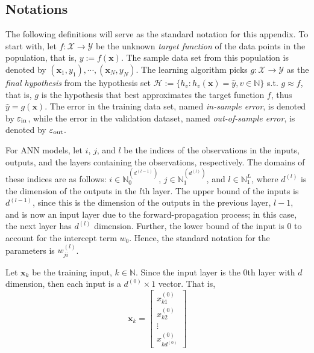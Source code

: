\subsection{Notations}
The following definitions will serve as the standard notation for this appendix. To start with, let $f:\mathcal{X}\to\mathcal{Y}$ be the unknown \textit{target function} of the data points in the population, that is, $y:=f(\mathbf{x})$. The sample data set from this population is denoted by $(\mathbf{x}_1,y_1),\cdots,(\mathbf{x}_N,y_N)$. The learning algorithm picks $g:\mathcal{X}\to \mathcal{Y}$ as the \textit{final hypothesis} from the hypothesis set $\mathscr{H}:=\{h_v:h_v(\mathbf{x})=\hat{y},v\in\mathbb{N}\}$ s.t. $g\approx f$, that is, $g$ is the hypothesis that best approximates the target function $f$, thus $\hat{y}=g(\mathbf{x})$. The error in the training data set, named \textit{in-sample error}, is denoted by $\varepsilon_{\mathrm{in}}$, while the error in the validation dataset, named \textit{out-of-sample error}, is denoted by $\varepsilon_{\mathrm{out}}$.

For ANN models, let $i$, $j$, and $l$ be the indices of the observations in the inputs, outputs, and the layers containing the observations, respectively. The domains of these indices are as follows: $i\in\mathbb{N}_0^{(d^{(l-1)})}$, $j\in\mathbb{N}_1^{(d^{(l)})}$, and $l\in\mathbb{N}_1^L$, where $d^{(l)}$ is the dimension of the outputs in the $l$th layer. The upper bound of the inputs is $d^{(l-1)}$, since this is the dimension of the outputs in the previous layer, $l-1$, and is now an input layer due to the forward-propagation process; in this case, the next layer has $d^{(l)}$ dimension. Further, the lower bound of the input is 0 to account for the intercept term $w_0$. Hence, the standard notation for the parameters is $w_{ji}^{(l)}$.

Let $\mathbf{x}_k$ be the training input, $k\in\mathbb{N}$. Since the input layer is the $0$th layer with $d$ dimension, then each input is a $d^{(0)}\times 1$ vector. That is,
$$
\mathbf{x}_k=\left[
\begin{array}{c}
x_{k1}^{(0)}\\
x_{k2}^{(0)}\\
\vdots\\
x_{kd^{(0)}}^{(0)}
\end{array}
\right]
$$

